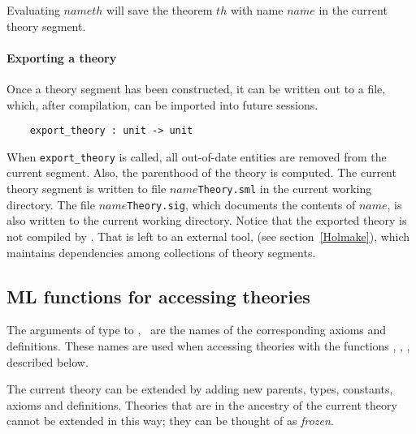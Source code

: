 \noindent
Evaluating $\mathit{name}$$\mathit{th}$\ml{)}
will save the theorem
%
%
$\mathit{th}$ with name $\mathit{name}$ in the current theory
segment.

\paragraph{Exporting a theory}

Once a theory segment has been constructed, it can be written out to a
file, which, after compilation, can be imported into future sessions.

\begin{holboxed}
\begin{verbatim}
    export_theory : unit -> unit
\end{verbatim}
\end{holboxed}

When {\small\verb+export_theory+} is called, all out-of-date entities
are removed from the current segment. Also, the parenthood of the
theory is computed. The current theory segment is written to file
$name${\small{\tt Theory.sml}} in the current working directory.  The
file $name${\small{\tt Theory.sig}}, which documents the contents of
$name$, is also written to the current working directory.  Notice that
the exported theory is not compiled by \HOL. That is left to an
external tool, \holmake{} (see section~\ref{Holmake}), which maintains
dependencies among collections of \HOL{} theory segments.


\subsection{ML functions for accessing theories}

%
The arguments of \ML{} type  to ,
 \etc\ are the names of the corresponding axioms
and definitions. These names are used when accessing theories with the
functions , , \etc, described below.

The current theory
%
%
can be extended by adding new parents, types, constants, axioms and
definitions. Theories that are in the ancestry of the current theory
cannot be extended in this way; they can be thought of as
\emph{frozen}.

